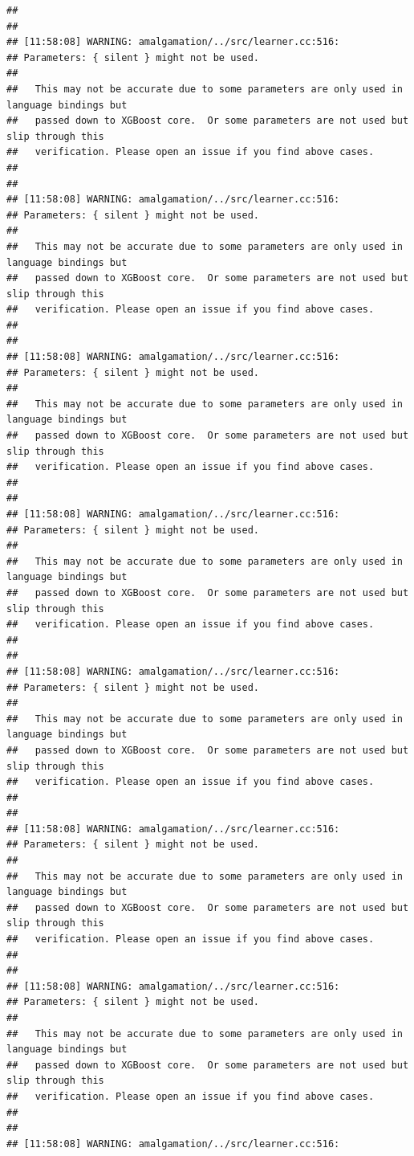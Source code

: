 \documentclass[AMS,STIX2COL]{WileyNJD-v2}\usepackage[]{graphicx}\usepackage[]{color}
\makeatletter
\newenvironment{kframe}{%
 \def\at@end@of@kframe{}%
 \ifinner\ifhmode%
  \def\at@end@of@kframe{\end{minipage}}%
  \begin{minipage}{\columnwidth}%
 \fi\fi%
 \def\FrameCommand##1{\hskip\@totalleftmargin \hskip-\fboxsep
 \colorbox{shadecolor}{##1}\hskip-\fboxsep
     \hskip-\linewidth \hskip-\@totalleftmargin \hskip\columnwidth}%
 \MakeFramed {\advance\hsize-\width
   \@totalleftmargin\z@ \linewidth\hsize
   \@setminipage}}%
 {\par\unskip\endMakeFramed%
 \at@end@of@kframe}
\newenvironment{knitrout}{}{} %
\makeatother
\begin{document}
\begin{knitrout}
\begin{kframe}
\begin{verbatim}
## 
## 
## [11:58:08] WARNING: amalgamation/../src/learner.cc:516: 
## Parameters: { silent } might not be used.
## 
##   This may not be accurate due to some parameters are only used in language bindings but
##   passed down to XGBoost core.  Or some parameters are not used but slip through this
##   verification. Please open an issue if you find above cases.
## 
## 
## [11:58:08] WARNING: amalgamation/../src/learner.cc:516: 
## Parameters: { silent } might not be used.
## 
##   This may not be accurate due to some parameters are only used in language bindings but
##   passed down to XGBoost core.  Or some parameters are not used but slip through this
##   verification. Please open an issue if you find above cases.
## 
## 
## [11:58:08] WARNING: amalgamation/../src/learner.cc:516: 
## Parameters: { silent } might not be used.
## 
##   This may not be accurate due to some parameters are only used in language bindings but
##   passed down to XGBoost core.  Or some parameters are not used but slip through this
##   verification. Please open an issue if you find above cases.
## 
## 
## [11:58:08] WARNING: amalgamation/../src/learner.cc:516: 
## Parameters: { silent } might not be used.
## 
##   This may not be accurate due to some parameters are only used in language bindings but
##   passed down to XGBoost core.  Or some parameters are not used but slip through this
##   verification. Please open an issue if you find above cases.
## 
## 
## [11:58:08] WARNING: amalgamation/../src/learner.cc:516: 
## Parameters: { silent } might not be used.
## 
##   This may not be accurate due to some parameters are only used in language bindings but
##   passed down to XGBoost core.  Or some parameters are not used but slip through this
##   verification. Please open an issue if you find above cases.
## 
## 
## [11:58:08] WARNING: amalgamation/../src/learner.cc:516: 
## Parameters: { silent } might not be used.
## 
##   This may not be accurate due to some parameters are only used in language bindings but
##   passed down to XGBoost core.  Or some parameters are not used but slip through this
##   verification. Please open an issue if you find above cases.
## 
## 
## [11:58:08] WARNING: amalgamation/../src/learner.cc:516: 
## Parameters: { silent } might not be used.
## 
##   This may not be accurate due to some parameters are only used in language bindings but
##   passed down to XGBoost core.  Or some parameters are not used but slip through this
##   verification. Please open an issue if you find above cases.
## 
## 
## [11:58:08] WARNING: amalgamation/../src/learner.cc:516: 

\end{verbatim}
\end{kframe}
\end{knitrout}
\end{document}
